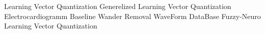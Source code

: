 	{ Learning Vector Quantization }
	{ Generelized Learning Vector Quantization }
	{ Electrocardiogramm }
	{ Baseline Wander Removal }
	{ WaveForm DataBase }
	{ Fuzzy-Neuro Learning Vector Quantization }
